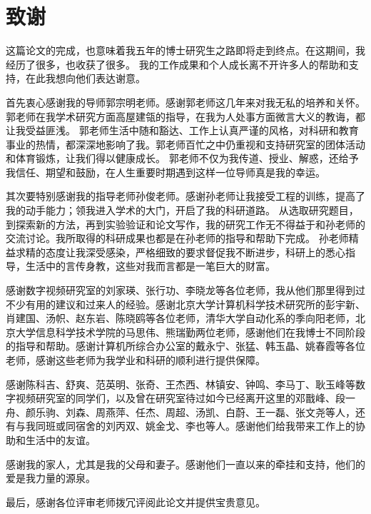 \chapter{致谢}

这篇论文的完成，也意味着我五年的博士研究生之路即将走到终点。在这期间，我经历了很多，也收获了很多。
我的工作成果和个人成长离不开许多人的帮助和支持，在此我想向他们表达谢意。

首先衷心感谢我的导师郭宗明老师。感谢郭老师这几年来对我无私的培养和关怀。郭老师在我学术研究方面高屋建瓴的指导，在我为人处事方面微言大义的教诲，都让我受益匪浅。
郭老师生活中随和豁达、工作上认真严谨的风格，对科研和教育事业的热情，都深深地影响了我。郭老师百忙之中仍重视和支持研究室的团体活动和体育锻炼，让我们得以健康成长。
郭老师不仅为我传道、授业、解惑，还给予我信任、期望和鼓励，在人生重要时期遇到这样一位导师真是我的幸运。

其次要特别感谢我的指导老师孙俊老师。感谢孙老师让我接受工程的训练，提高了我的动手能力；领我进入学术的大门，开启了我的科研道路。
从选取研究题目，到探索新的方法，再到实验验证和论文写作，我的研究工作无不得益于和孙老师的交流讨论。我所取得的科研成果也都是在孙老师的指导和帮助下完成。
孙老师精益求精的态度让我深受感染，严格细致的要求督促我不断进步，科研上的悉心指导，生活中的言传身教，这些对我而言都是一笔巨大的财富。

感谢数字视频研究室的刘家瑛、张行功、李晓龙等各位老师，我从他们那里得到过不少有用的建议和过来人的经验。感谢北京大学计算机科学技术研究所的彭宇新、肖建国、汤帜、赵东岩、陈晓鸥等各位老师，清华大学自动化系的季向阳老师，北京大学信息科学技术学院的马思伟、熊瑞勤两位老师，感谢他们在我博士不同阶段的指导和帮助。感谢计算机所综合办公室的戴永宁、张猛、韩玉晶、姚春霞等各位老师，感谢这些老师为我学业和科研的顺利进行提供保障。

感谢陈科吉、舒爽、范英明、张奇、王杰西、林镇安、钟鸣、李马丁、耿玉峰等数字视频研究室的同学们，以及曾在研究室待过如今已经离开这里的邓戬峰、段一舟、颜乐驹、刘森、周燕萍、任杰、周超、汤凯、白蔚、王一磊、张文尧等人，还有与我同班或同宿舍的刘丙双、姚金戈、李也等人。感谢他们给我带来工作上的协助和生活中的友谊。

感谢我的家人，尤其是我的父母和妻子。感谢他们一直以来的牵挂和支持，他们的爱是我力量的源泉。

最后，感谢各位评审老师拨冗评阅此论文并提供宝贵意见。